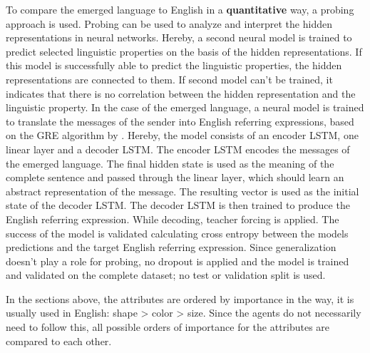 To compare the emerged language to English in a \textbf{quantitative} way, a probing approach is used.
Probing can be used to analyze and interpret the hidden representations in neural networks.
Hereby, a second neural model is trained to predict selected linguistic properties on the basis of the hidden representations.
If this model is successfully able to predict the linguistic properties, the hidden representations are connected to them.
If second model can't be trained, it indicates that there is no correlation between the hidden representation and the linguistic property.
In the case of the emerged language, a neural model is trained to translate the messages of the sender into English referring expressions, based on the GRE algorithm by \citet{Dale1995}.
Hereby, the model consists of an encoder LSTM, one linear layer and a decoder LSTM.
The encoder LSTM encodes the messages of the emerged language.
The final hidden state is used as the meaning of the complete sentence and passed through the linear layer, which should learn an abstract representation of the message.
The resulting vector is used as the initial state of the decoder LSTM.
The decoder LSTM is then trained to produce the English referring expression.
While decoding, teacher forcing is applied.
The success of the model is validated calculating cross entropy between the models predictions and the target English referring expression.
Since generalization doesn't play a role for probing, no dropout is applied and the model is trained and validated on the complete dataset; no test or validation split is used.

In the sections above, the attributes are ordered by importance in the way, it is usually used in English: shape > color > size.
Since the agents do not necessarily need to follow this, all possible orders of importance for the attributes are compared to each other.

